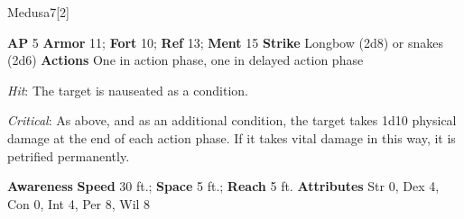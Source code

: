 \begin{monsection}{Medusa}{7}[2]
\vspace{-1em}\vspace{-1em}
\begin{spellcontent}
\begin{spelltargetinginfo}
{\textbf{AP} 5}
\pari \textbf{Armor} 11;
\textbf{Fort} 10;
\textbf{Ref} 13;
\textbf{Ment} 15
\pari \textbf{Strike} Longbow  (2d8) or snakes  (2d6)
\pari \textbf{Actions} One in action phase, one in delayed action phase
\end{spelltargetinginfo}
\begin{spelleffects}
\pari
{}
\par
\par \textit{Hit}: The target is nauseated as a condition.
\par \textit{Critical}:
As above, and as an additional condition, the target takes 1d10 physical damage at the end of each action phase.
If it takes vital damage in this way, it is petrified permanently.
\end{spelleffects}
\end{spellcontent}
\begin{spellsubcontent}
\begin{spellfooter}
\pari \textbf{Awareness} 
\pari \textbf{Speed} 30 ft.;
\textbf{Space} 5 ft.;
\textbf{Reach} 5 ft.
\pari \textbf{Attributes}
Str 0,
Dex 4,
Con 0,
Int 4,
Per 8,
Wil 8
\end{spellfooter}
\end{spellsubcontent}
\end{monsection}
